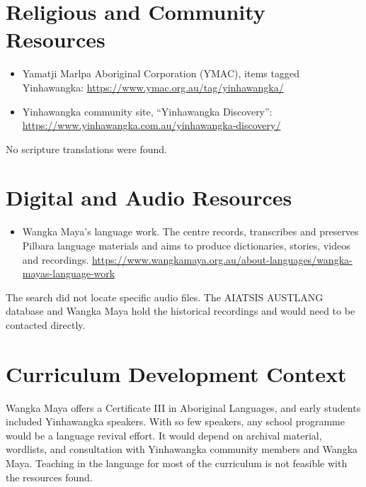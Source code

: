 \documentclass[12pt]{article}
\begin{document}
\section{Religious and Community Resources}
\begin{itemize}
\item Yamatji Marlpa Aboriginal Corporation (YMAC), items tagged Yinhawangka: \url{https://www.ymac.org.au/tag/yinhawangka/}
\item Yinhawangka community site, ``Yinhawangka Discovery'': \url{https://www.yinhawangka.com.au/yinhawangka-discovery/}
\end{itemize}
No scripture translations were found.

\section{Digital and Audio Resources}
\begin{itemize}
\item Wangka Maya's language work. The centre records, transcribes and preserves Pilbara language materials and aims to produce dictionaries, stories, videos and recordings. \url{https://www.wangkamaya.org.au/about-languages/wangka-mayas-language-work}
\end{itemize}
The search did not locate specific audio files. The AIATSIS AUSTLANG database and Wangka Maya hold the historical recordings and would need to be contacted directly.

\section{Curriculum Development Context}
Wangka Maya offers a Certificate III in Aboriginal Languages, and early students included Yinhawangka speakers. With so few speakers, any school programme would be a language revival effort. It would depend on archival material, wordlists, and consultation with Yinhawangka community members and Wangka Maya. Teaching in the language for most of the curriculum is not feasible with the resources found.
\end{document}
